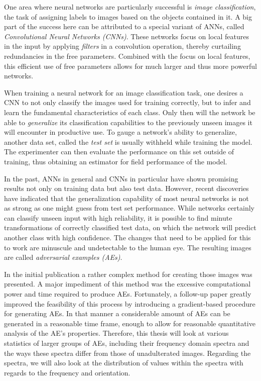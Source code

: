 \documentclass[11pt, a4paper]{article}
\begin{document}
One area where neural networks are particularly successful is \emph{image classification}, the task of assigning labels to images based on the objects contained in it. A big part of the success here can be attributed to a special variant of ANNs, called \emph{Convolutional Neural Networks (CNNs)}. These networks focus on local features in the input by applying \emph{filters} in a convolution operation, thereby curtailing redundancies in the free parameters. Combined with the focus on local features, this efficient use of free parameters allows for much larger and thus more powerful networks.

When training a neural network for an image classification task, one desires a CNN to not only classify the images used for training correctly, but to infer and learn the fundamental characteristics of each class. Only then will the network be able to \emph{generalize} its classification capabilities to the previously unseen images it will encounter in productive use. To gauge a network's ability to generalize, another data set, called the \emph{test set} is usually withheld while training the model. The experimenter can then evaluate the performance on this set outside of training, thus obtaining an estimator for field performance of the model.

In the past, ANNs in general and CNNs in particular have shown promising results not only on training data but also test data. However, recent discoveries have indicated that the generalization capability of most neural networks is not as strong as one might guess from test set performance. While networks certainly can classify unseen input with high reliability, it is possible to find minute transformations of correctly classified test data, on which the network will predict another class with high confidence. The changes that need to be applied for this to work are minuscule and undetectable to the human eye. The resulting images are called \emph{adversarial examples (AEs)}.

In the initial publication a rather complex method for creating those images was presented. A major impediment of this method was the excessive computational power and time required to produce AEs. Fortunately, a follow-up paper greatly improved the feasibility of this process by introducing a gradient-based procedure for generating AEs. In that manner a considerable amount of AEs can be generated in a reasonable time frame, enough to allow for reasonable quantitative analysis of the AE's properties. Therefore, this thesis will look at various statistics of larger groups of AEs, including their frequency domain spectra and the ways these spectra differ from those of unadulterated images. Regarding the spectra, we will also look at the distribution of values within the spectra with regards to the frequency and orientation.
\end{document}
